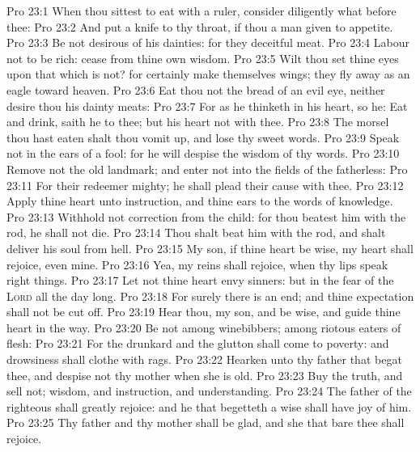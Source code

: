 \vs Pro 23:1 When thou sittest to eat with a ruler, consider diligently what  before thee:
\vs Pro 23:2 And put a knife to thy throat, if thou  a man given to appetite.
\vs Pro 23:3 Be not desirous of his dainties: for they  deceitful meat.
\vs Pro 23:4 Labour not to be rich: cease from thine own wisdom.
\vs Pro 23:5 Wilt thou set thine eyes upon that which is not? for  certainly make themselves wings; they fly away as an eagle toward heaven.
\vs Pro 23:6 Eat thou not the bread of  an evil eye, neither desire thou his dainty meats:
\vs Pro 23:7 For as he thinketh in his heart, so  he: Eat and drink, saith he to thee; but his heart  not with thee.
\vs Pro 23:8 The morsel  thou hast eaten shalt thou vomit up, and lose thy sweet words.
\vs Pro 23:9 Speak not in the ears of a fool: for he will despise the wisdom of thy words.
\vs Pro 23:10 Remove not the old landmark; and enter not into the fields of the fatherless:
\vs Pro 23:11 For their redeemer  mighty; he shall plead their cause with thee.
\vs Pro 23:12 Apply thine heart unto instruction, and thine ears to the words of knowledge.
\vs Pro 23:13 Withhold not correction from the child: for  thou beatest him with the rod, he shall not die.
\vs Pro 23:14 Thou shalt beat him with the rod, and shalt deliver his soul from hell.
\vs Pro 23:15 My son, if thine heart be wise, my heart shall rejoice, even mine.
\vs Pro 23:16 Yea, my reins shall rejoice, when thy lips speak right things.
\vs Pro 23:17 Let not thine heart envy sinners: but  in the fear of the \textsc{Lord} all the day long.
\vs Pro 23:18 For surely there is an end; and thine expectation shall not be cut off.
\vs Pro 23:19 Hear thou, my son, and be wise, and guide thine heart in the way.
\vs Pro 23:20 Be not among winebibbers; among riotous eaters of flesh:
\vs Pro 23:21 For the drunkard and the glutton shall come to poverty: and drowsiness shall clothe  with rags.
\vs Pro 23:22 Hearken unto thy father that begat thee, and despise not thy mother when she is old.
\vs Pro 23:23 Buy the truth, and sell  not;  wisdom, and instruction, and understanding.
\vs Pro 23:24 The father of the righteous shall greatly rejoice: and he that begetteth a wise  shall have joy of him.
\vs Pro 23:25 Thy father and thy mother shall be glad, and she that bare thee shall rejoice.
